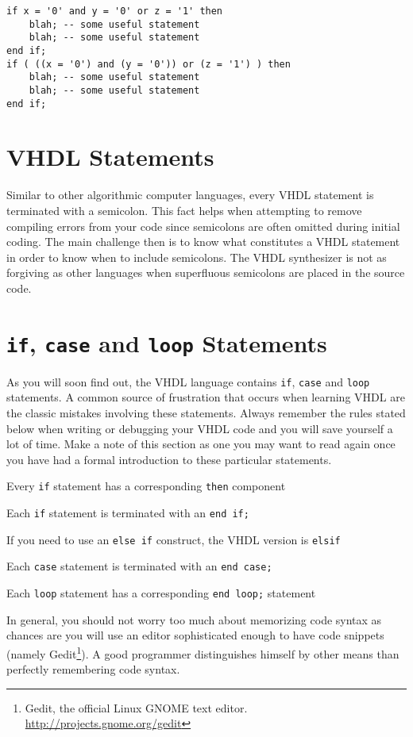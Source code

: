 \noindent
\begin{minipage}{0.99\linewidth}
\begin{lstlisting}[label=parenthesis, caption=Example of parentheses that can improve clarity.]
if x = '0' and y = '0' or z = '1' then
	blah; -- some useful statement
	blah; -- some useful statement
end if;
if ( ((x = '0') and (y = '0')) or (z = '1') ) then
	blah; -- some useful statement
	blah; -- some useful statement
end if;
\end{lstlisting}
\end{minipage}

\section{VHDL Statements}
Similar to other algorithmic computer languages, every VHDL statement is terminated with a semicolon. This fact helps when attempting to remove compiling errors from your code since semicolons are often omitted during initial coding. The main challenge then is to know what constitutes a VHDL statement in order to know when to include semicolons. The VHDL synthesizer is not as forgiving as other languages when superfluous semicolons are placed in the source code.

\section{\texttt{if}, \texttt{case} and \texttt{loop} Statements}
As you will soon find out, the VHDL language contains \texttt{if}, \texttt{case} and \texttt{loop} statements. A common source of frustration that occurs when learning VHDL are the classic mistakes involving these statements. Always remember the rules stated below when writing or debugging your VHDL code and you will save yourself a lot of time. Make a note of this section as one you may want to read again once you have had a formal introduction to these particular statements.
\begin{my_list}
\item Every \texttt{if} statement has a corresponding \texttt{then} component
\item Each \texttt{if} statement is terminated with an \texttt{end if;}
\item If you need to use an \texttt{else if} construct, the VHDL version is \texttt{elsif}
\item Each \texttt{case} statement is terminated with an \texttt{end case;}
\item Each \texttt{loop} statement has a corresponding \texttt{end loop;} statement
\end{my_list}
In general, you should not worry too much about memorizing code syntax as chances are you will use an editor sophisticated enough to have code snippets (namely Gedit\footnote{Gedit, the official Linux GNOME text editor. {\footnotesize\url{http://projects.gnome.org/gedit}}}). A good programmer distinguishes himself by other means than perfectly remembering code syntax.


